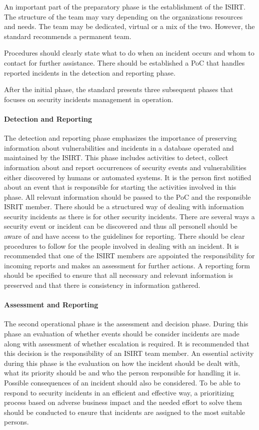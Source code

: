 An important part of the preparatory phase is the establishment of the ISIRT. The structure of the team may vary depending on the organizations resources and needs. The team may be dedicated, virtual or a mix of the two. However, the standard recommends a permanent team. 

Procedures should clearly state what to do when an incident occurs and whom to contact for further assistance. There should be established a \acs{PoC} that handles reported incidents in the detection and reporting phase.

After the initial phase, the standard presents three subsequent phases that focuses on  security incidents management in operation. 

\paragraph{Detection and Reporting} The detection and reporting phase emphasizes the importance of preserving information about vulnerabilities and incidents in a database operated and maintained by the ISIRT. This phase includes activities to detect, collect information about and report occurrences of security events and vulnerabilities either discovered by humans or automated systems. It is the person first notified about an event that is responsible for starting the activities involved in this phase. All relevant information should be passed to the PoC and the responsible ISRIT member. There should be a structured way of dealing with information security incidents as there is for other security incidents. There are several ways a security event or incident can be discovered and thus all personell should be aware of and have access to the guidelines for reporting. There should be clear procedures to follow for the people involved in dealing with an incident. It is recommended that one of the ISIRT members are appointed the responsibility for incoming reports and makes an assessment for further actions.  A reporting form should be specified to ensure that all necessary and relevant information is preserved and that there is consistency in information gathered. 

\paragraph{Assessment and Reporting} The second operational phase is the assessment and decision phase. During this phase an evaluation of whether events should be consider incidents are made along with assessment of whether escalation is required. It is recommended that this decision is the responsibility of an ISIRT team member. An essential activity during this phase is the evaluation on how the incident should be dealt with, what its priority should be and who the person responsible for handling it is. Possible consequences of an incident should also be considered. To be able to respond to security incidents in an efficient and effective way, a prioritizing process based on adverse business impact and the needed effort to solve them should be conducted to ensure that incidents are assigned to the most suitable persons. 

